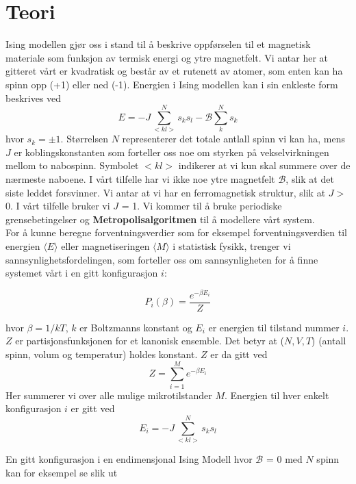 \documentclass[11pt,a4paper]{article}
\begin{document}
\section{Teori}
Ising modellen gjør oss i stand til å beskrive oppførselen til et magnetisk materiale som funksjon av termisk energi og ytre magnetfelt. Vi antar her at gitteret vårt er kvadratisk og består av et rutenett av atomer, som enten kan ha spinn opp (+1) eller ned (-1). Energien i Ising modellen kan i sin enkleste form beskrives ved 
\begin{equation}
E = -J\sum_{<kl>}^N s_ks_l - \mathcal{ B} \sum_k^N s_k
\end{equation}
hvor $s_k = \pm 1$. Størrelsen $N$ representerer det totale antlall spinn vi kan ha, mens $J$ er koblingskonstanten som forteller oss noe om styrken på vekselvirkningen mellom to nabospinn. Symbolet $<kl>$ indikerer at vi kun skal summere over de nærmeste naboene. I vårt tilfelle har vi ikke noe ytre magnetfelt $\mathcal{B}$, slik at det siste leddet forsvinner. Vi antar at vi har en ferromagnetisk struktur, slik at $J >$ 0. I vårt tilfelle bruker vi $J$ = 1. Vi kommer til å bruke periodiske grensebetingelser og \textbf{Metropolisalgoritmen} til å modellere vårt system. \\

For å kunne beregne forventningsverdier som for eksempel forventningsverdien til energien $\langle E \rangle$ eller magnetiseringen $\langle M \rangle$ i statistisk fysikk, trenger vi sannsynlighetsfordelingen, som forteller oss om sannsynligheten for å finne systemet vårt i en gitt konfigurasjon $i$:

\begin{equation}
P_i(\beta) = \frac{e^{-\beta E_i}}{Z}
\end{equation}

hvor $\beta = 1/kT$, $k$ er Boltzmanns konstant og $E_i$ er energien til tilstand nummer $i$. $Z$ er partisjonsfunksjonen for et kanonisk ensemble. Det betyr at ($N,V,T$) (antall spinn, volum og temperatur) holdes konstant. $Z$ er da gitt ved
\begin{equation}
Z = \sum_{i=1}^M e^{-\beta E_i }
\end{equation}
Her summerer vi over alle mulige mikrotilstander $M$. Energien til hver enkelt konfigurasjon $i$ er gitt ved
\begin{equation}
E_i = -J\sum_{<kl>}^N s_k s_l
\end{equation}

En gitt konfigurasjon i en endimensjonal Ising Modell hvor $\mathcal{B}$ = 0 med $N$ spinn kan for eksempel se slik ut
\end{document}
